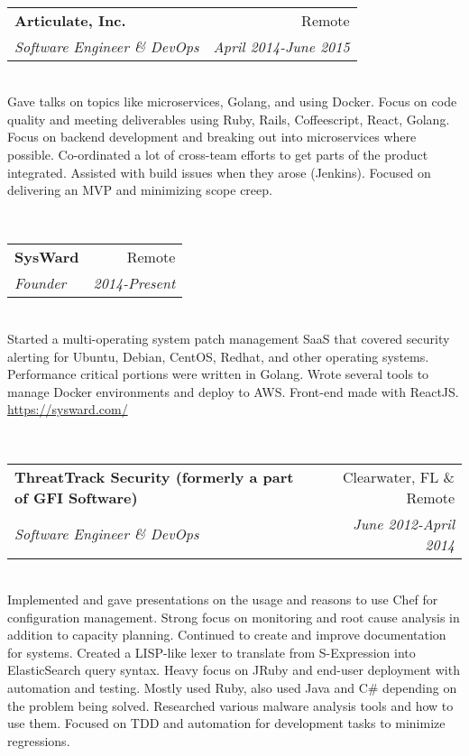 \documentclass[a4paper,11pt,sans]{article}
\makeatletter
\newcommand{\ressubheading}[4]{
\begin{tabular*}{7.0in}{l@{\extracolsep{\fill}}r}
		\textbf{#1} & #2 \\
		\textit{#3} & \textit{#4} \\
\end{tabular*}\vspace{-6pt}}
\makeatother
\begin{document}
\hspace{5pt} \\

\ressubheading{Articulate, Inc.}{Remote}{Software Engineer \& DevOps}{April 2014-June 2015}

\hspace{5pt} \\

Gave talks on topics like microservices, Golang, and using Docker. Focus on code quality and meeting deliverables using Ruby, Rails, Coffeescript, React, Golang. Focus on backend development and breaking out into microservices where possible. Co-ordinated a lot of cross-team efforts to get parts of the product integrated. Assisted with build issues when they arose (Jenkins). Focused on delivering an MVP and minimizing scope creep.

\hspace{5pt} \\

\ressubheading{SysWard}{Remote}{Founder}{2014-Present}

\hspace{5pt} \\

Started a multi-operating system patch management SaaS that covered security alerting for Ubuntu, Debian, CentOS, Redhat, and other operating systems. Performance critical portions were written in Golang. Wrote several tools to manage Docker environments and deploy to AWS. Front-end made with ReactJS. \url{https://sysward.com/}

\hspace{5pt} \\

\ressubheading{ThreatTrack Security (formerly a part of GFI Software)}{Clearwater, FL \& Remote}{Software Engineer \& DevOps}{June 2012-April 2014}

\hspace{5pt} \\
Implemented and gave presentations on the usage and reasons to use Chef for configuration management. Strong focus on monitoring and root cause analysis in addition to capacity planning. Continued to create and improve documentation for systems. Created a
LISP-like lexer to translate from S-Expression into ElasticSearch query syntax. Heavy focus on JRuby and end-user deployment with automation and testing. Mostly used Ruby, also used Java and C\#
depending on the problem being solved. Researched various malware analysis tools and how to use them. Focused on TDD and automation for development tasks to minimize regressions.
\end{document}
